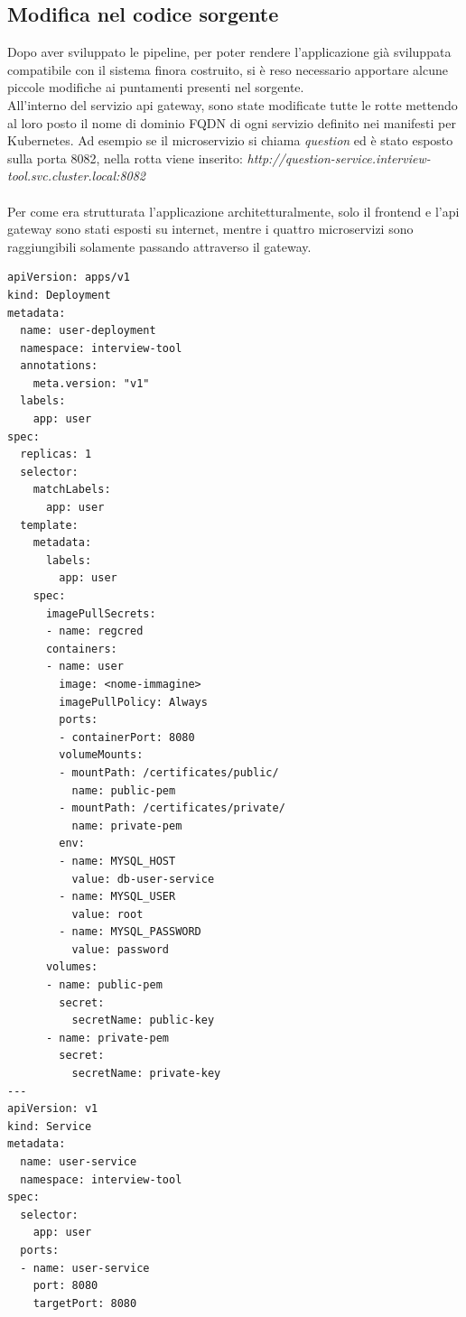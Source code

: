 \documentclass[a4paper,12pt]{report}
\begin{document}
\subsection{Modifica nel codice sorgente}
Dopo aver sviluppato le pipeline, per poter rendere l'applicazione già sviluppata compatibile con il sistema finora costruito, si è reso necessario apportare alcune piccole modifiche ai puntamenti presenti nel sorgente.\\
All'interno del servizio api gateway, sono state modificate tutte le rotte mettendo al loro posto il nome di dominio FQDN di ogni servizio definito nei manifesti per Kubernetes. Ad esempio se il microservizio si chiama \textit{question} ed è stato esposto sulla porta 8082, nella rotta viene inserito: \textit{http://question-service.interview-tool.svc.cluster.local:8082}\\ \\
Per come era strutturata l'applicazione architetturalmente, solo il frontend e l'api gateway sono stati esposti su internet, mentre i quattro microservizi sono raggiungibili solamente passando attraverso il gateway.\\ 
\begin{lstlisting}[caption={\\\textit{Manifesto YAML definito per uno dei quattro microservizi chiamato user.\\ Nella prima parte è definito un oggetto di tipo deployment che presenta le specifiche del container, a partire dal nome, namespace fino all'immagine che dovrà esserci montata sopra.\\ Sempre sul deployment sono stati definiti anche dei volumi per montare delle chiavi necessarie per il microservizio, oltre a delle variabili d'ambiente per richiamare il database.\\ Nella seconda parte del manifesto è definito un oggetto di tipo service per esporre sulla porta 8080.}}]
apiVersion: apps/v1
kind: Deployment
metadata:
  name: user-deployment
  namespace: interview-tool
  annotations:
    meta.version: "v1"
  labels:
    app: user
spec:
  replicas: 1
  selector:
    matchLabels:
      app: user
  template:
    metadata:
      labels:
        app: user
    spec:
      imagePullSecrets:
      - name: regcred
      containers:
      - name: user
        image: <nome-immagine>
        imagePullPolicy: Always
        ports:
        - containerPort: 8080
        volumeMounts:
        - mountPath: /certificates/public/
          name: public-pem
        - mountPath: /certificates/private/
          name: private-pem
        env:
        - name: MYSQL_HOST
          value: db-user-service
        - name: MYSQL_USER
          value: root
        - name: MYSQL_PASSWORD
          value: password
      volumes:
      - name: public-pem
        secret:
          secretName: public-key
      - name: private-pem
        secret:
          secretName: private-key        
---
apiVersion: v1
kind: Service
metadata:
  name: user-service
  namespace: interview-tool
spec:
  selector:
    app: user
  ports:
  - name: user-service
    port: 8080
    targetPort: 8080
\end{lstlisting}
\end{document}
